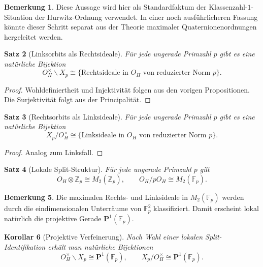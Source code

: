 \documentclass[a4paper,12pt]{article}
\newtheorem{satz}{Satz}[section]
\newtheorem{korollar}[satz]{Korollar}
\theoremstyle{definition}
\newtheorem{bemerkung}[satz]{Bemerkung}
\numberwithin{equation}{section}
\newcommand{\OH}{O_H}
\newcommand{\Z}{\mathbb{Z}}
\newcommand{\Fp}{\mathbb{F}_p}
\begin{document}
	\begin{bemerkung}
		Diese Aussage wird hier als Standardfaktum der Klassenzahl-\(1\)-Situation der Hurwitz-Ordnung verwendet. In einer noch ausführlicheren Fassung könnte dieser Schritt separat aus der Theorie maximaler Quaternionenordnungen hergeleitet werden.
	\end{bemerkung}
	
	\begin{satz}[Linksorbits als Rechtsideale]
		Für jede ungerade Primzahl \(p\) gibt es eine natürliche Bijektion
		\[
		\OH^\times\backslash X_p
		\cong
		\{\text{Rechtsideale in }\OH\text{ von reduzierter Norm }p\}.
		\]
	\end{satz}
	
	\begin{proof}
		Wohldefiniertheit und Injektivität folgen aus den vorigen Propositionen. Die Surjektivität folgt aus der Principalität.
	\end{proof}
	
	\begin{satz}[Rechtsorbits als Linksideale]
		Für jede ungerade Primzahl \(p\) gibt es eine natürliche Bijektion
		\[
		X_p/\OH^\times
		\cong
		\{\text{Linksideale in }\OH\text{ von reduzierter Norm }p\}.
		\]
	\end{satz}
	
	\begin{proof}
		Analog zum Linksfall.
	\end{proof}
	
	\begin{satz}[Lokale Split-Struktur]
		Für jede ungerade Primzahl \(p\) gilt
		\[
		\OH\otimes\Z_p\cong M_2(\Z_p),
		\qquad
		\OH/p\OH\cong M_2(\Fp).
		\]
	\end{satz}
	
	\begin{bemerkung}
		Die maximalen Rechts- und Linksideale in \(M_2(\Fp)\) werden durch die eindimensionalen Unterräume von \(\Fp^2\) klassifiziert. Damit erscheint lokal natürlich die projektive Gerade \(\mathbf P^1(\Fp)\).
	\end{bemerkung}
	
	\begin{korollar}[Projektive Verfeinerung]
		Nach Wahl einer lokalen Split-Identifikation erhält man natürliche Bijektionen
		\[
		\OH^\times\backslash X_p \cong \mathbf P^1(\Fp),
		\qquad
		X_p/\OH^\times \cong \mathbf P^1(\Fp).
		\]
	\end{korollar}
	
\end{document}
